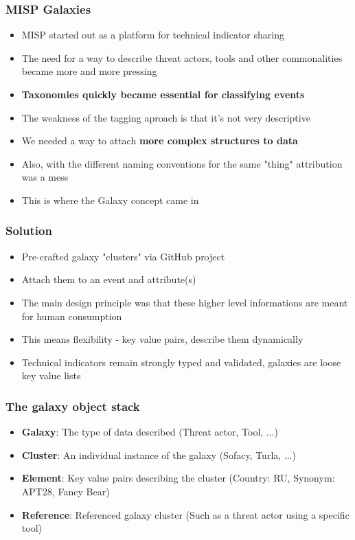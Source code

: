 
\begin{frame}[t,plain]
\titlepage
\end{frame}

\begin{frame}
\frametitle{MISP Galaxies}
    \begin{itemize}
    \item MISP started out as a platform for technical indicator sharing
    \item The need for a way to describe threat actors, tools and other commonalities became more and more pressing
    \item {\bf Taxonomies quickly became essential for classifying events}
    \item The weakness of the tagging aproach is that it's not very descriptive
    \item We needed a way to attach {\bf more complex structures to data}
    \item Also, with the different naming conventions for the same "thing" attribution was a mess
    \item This is where the Galaxy concept came in
    \end{itemize}
\end{frame}


\begin{frame}
\frametitle{Solution}
    \begin{itemize}
    	\item Pre-crafted galaxy "clusters" via GitHub project
        \item Attach them to an event and attribute(s)
    	\item The main design principle was that these higher level informations are meant for human consumption
    	\item This means flexibility - key value pairs, describe them dynamically
    	\item Technical indicators remain strongly typed and validated, galaxies are loose key value lists
    \end{itemize}
\end{frame}


\begin{frame}
\frametitle{The galaxy object stack}
    \begin{itemize}
    	\item {\bf Galaxy}: The type of data described (Threat actor, Tool, ...)
       	\item {\bf Cluster}: An individual instance of the galaxy (Sofacy, Turla, ...)
       	\item {\bf Element}: Key value pairs describing the cluster (Country: RU, Synonym: APT28, Fancy Bear)
       	\item {\bf Reference}: Referenced galaxy cluster (Such as a threat actor using a specific tool)
    \end{itemize}
\end{frame}

